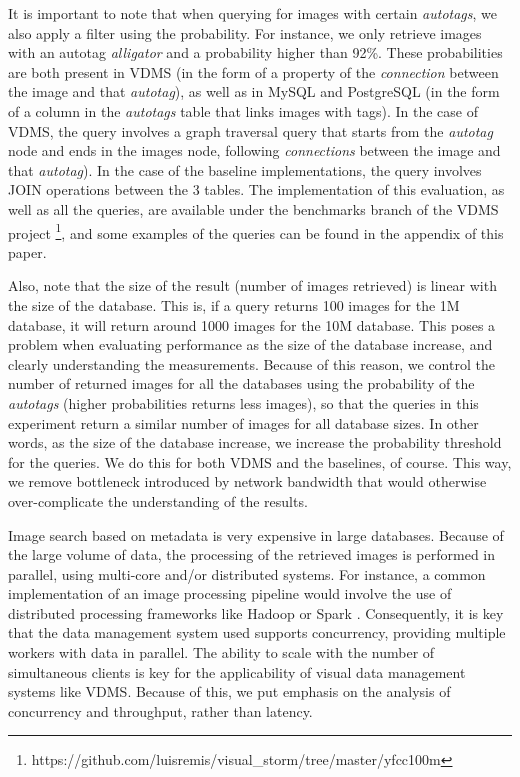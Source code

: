 It is important to note that when querying for images with certain
\textit{autotags}, we also apply a filter using the probability.
For instance, we only retrieve images with an autotag \textit{alligator}
and a probability higher than 92\%.
These probabilities are both present in VDMS (in the form of a property
of the \textit{connection} between the image and that \textit{autotag}),
as well as in MySQL and PostgreSQL (in the form of a column in the
\textit{autotags} table that links images with tags).
In the case of VDMS, the query involves a graph traversal query that starts
from the \textit{autotag} node and ends in the images node,
following \textit{connections} between the image and that \textit{autotag}).
In the case of the baseline implementations,
the query involves JOIN operations between the 3 tables.
The implementation of this evaluation, as well as all the queries, are available
under the benchmarks branch of the VDMS project
\footnote{https://github.com/luisremis/visual\_storm/tree/master/yfcc100m},
and some examples of the queries can be found in the appendix of this paper.

Also, note that the size of the result (number of images retrieved)
is linear with the size of the database. This is, if a query returns 100 images
for the 1M database, it will return around 1000 images for the 10M database.
This poses a problem when evaluating performance as the size of the database increase,
and clearly understanding the measurements.
Because of this reason, we control the number of returned images for all the
databases using the probability of the \textit{autotags}
(higher probabilities returns less images), so that the queries in
this experiment return a similar number of images for all database sizes.
In other words, as the size of the database increase, we increase the probability
threshold for the queries. We do this for both VDMS and the baselines, of course.
This way, we remove bottleneck introduced by network bandwidth that would
otherwise over-complicate the understanding of the results.

Image search based on metadata is very expensive in large databases.
Because of the large volume of data, the processing of the retrieved images
is performed in parallel, using multi-core and/or distributed systems.
For instance, a common implementation of an image processing pipeline
would involve the use of distributed processing frameworks
like Hadoop \cite{hadoop} or Spark \cite{spark}.
Consequently, it is key that the data management system used supports
concurrency, providing multiple workers with data in parallel.
The ability to scale with the number of simultaneous clients is key for the
applicability of visual data management systems like VDMS.
Because of this, we put emphasis on the analysis of concurrency and throughput,
rather than latency.


